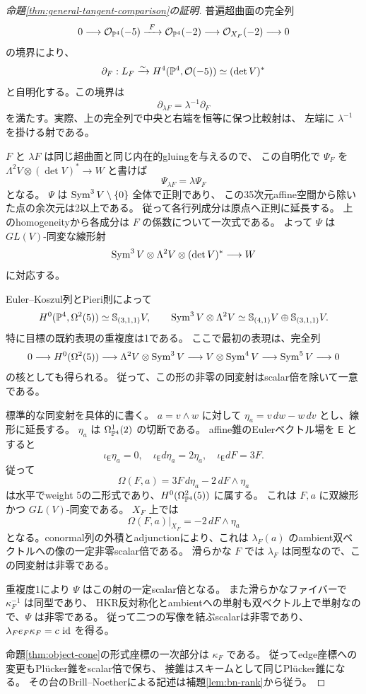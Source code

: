 \begin{proof}[命題\ref{thm:general-tangent-comparison}の証明]
普遍超曲面の完全列
\[
 0\longrightarrow\mathcal O_{\mathbb P^4}(-5)
 \xrightarrow{\ F\ }\mathcal O_{\mathbb P^4}(-2)
 \longrightarrow\mathcal O_{X_F}(-2)\longrightarrow0
\]
の境界により、
\[
 \partial_F:L_F\xrightarrow{\sim}
 H^4(\mathbb P^4,\mathcal O(-5))\simeq(\det V)^*
\]
と自明化する。この境界は
\[
                         \partial_{\lambda F}=\lambda^{-1}\partial_F
\]
を満たす。実際、上の完全列で中央と右端を恒等に保つ比較射は、
左端に $\lambda^{-1}$ を掛ける射である。

$F$ と $\lambda F$ は同じ超曲面と同じ内在的gluingを与えるので、
この自明化で $\Psi_F$ を
$\Lambda^2V\otimes(\det V)^*\to W$ と書けば
\[
                            \Psi_{\lambda F}=\lambda\Psi_F
\]
となる。
$\Psi$ は $\operatorname{Sym}^3V\setminus\{0\}$ 全体で正則であり、
この35次元affine空間から除いた点の余次元は2以上である。
従って各行列成分は原点へ正則に延長する。
上のhomogeneityから各成分は $F$ の係数について一次式である。
よって $\Psi$ は $GL(V)$-同変な線形射
\[
 \operatorname{Sym}^3V\otimes\Lambda^2V\otimes(\det V)^*
                   \longrightarrow W
\]
に対応する。

Euler--Koszul列とPieri則によって
\[
 H^0(\mathbb P^4,\Omega^2(5))\simeq\mathbb S_{(3,1,1)}V,
 \qquad
 \operatorname{Sym}^3V\otimes\Lambda^2V
  \simeq\mathbb S_{(4,1)}V\oplus\mathbb S_{(3,1,1)}V.
\]
特に目標の既約表現の重複度は1である。
ここで最初の表現は、完全列
\[
 0\longrightarrow H^0(\Omega^2(5))
 \longrightarrow\Lambda^2V\otimes\operatorname{Sym}^3V
 \longrightarrow V\otimes\operatorname{Sym}^4V
 \longrightarrow\operatorname{Sym}^5V\longrightarrow0
\]
の核としても得られる。
従って、この形の非零の同変射はscalar倍を除いて一意である。

標準的な同変射を具体的に書く。
$a=v\wedge w$ に対して $\eta_a=v\,dw-w\,dv$ とし、線形に延長する。
$\eta_a$ は $\Omega^1_{\mathbb P^4}(2)$ の切断である。
affine錐のEulerベクトル場を $\mathsf E$ とすると
\[
 \iota_{\mathsf E}\eta_a=0,\quad
 \iota_{\mathsf E}d\eta_a=2\eta_a,\quad
 \iota_{\mathsf E}dF=3F.
\]
従って
\[
                 \Omega(F,a)=3F\,d\eta_a-2\,dF\wedge\eta_a
\]
は水平でweight 5の二形式であり、$H^0(\Omega^2_{\mathbb P^4}(5))$ に属する。
これは $F,a$ に双線形かつ $GL(V)$-同変である。
$X_F$ 上では
\[
                         \Omega(F,a)|_{X_F}=-2\,dF\wedge\eta_a
\]
となる。conormal列の外積とadjunctionにより、これは
$\lambda_F(a)$ のambient双ベクトルへの像の一定非零scalar倍である。
滑らかな $F$ では $\lambda_F$ は同型なので、この同変射は非零である。

重複度1により $\Psi$ はこの射の一定scalar倍となる。
また滑らかなファイバーで $\kappa_F^{-1}$ は同型であり、
HKR反対称化とambientへの単射も双ベクトル上で単射なので、$\Psi$ は非零である。
従って二つの写像を結ぶscalarは非零であり、
$\lambda_F e_F\kappa_F=c\,\operatorname{id}$ を得る。

命題\ref{thm:object-cone}の形式座標の一次部分は $\kappa_F$ である。
従ってedge座標への変更もPl\"ucker錐をscalar倍で保ち、
接錐はスキームとして同じPl\"ucker錐になる。
その台のBrill--Noetherによる記述は補題\ref{lem:bn-rank}から従う。
\end{proof}

